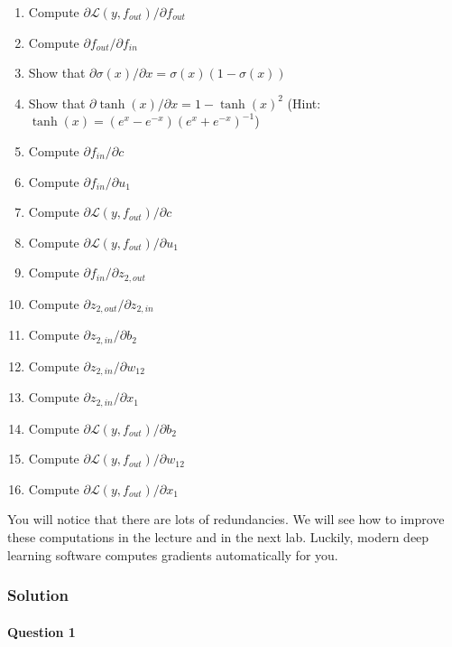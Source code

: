 \documentclass[
  a4paper,
]{article}
\providecommand{\tightlist}{%
  \setlength{\itemsep}{0pt}\setlength{\parskip}{0pt}}
\begin{document}
\begin{enumerate}
\def\labelenumi{\arabic{enumi}.}
\tightlist
\item
  Compute \(\partial\mathcal{L}(y, f_{out})/\partial f_{out}\)
\item
  Compute \(\partial f_{out}/\partial f_{in}\)
\item
  Show that \(\partial\sigma(x)/\partial x=\sigma(x)(1-\sigma(x))\)
\item
  Show that \(\partial\tanh(x)/\partial x=1-\tanh(x)^2\) (Hint:
  \(\tanh(x)=(e^x-e^{-x})(e^x+e^{-x})^{-1}\))
\item
  Compute \(\partial f_{in}/\partial c\)
\item
  Compute \(\partial f_{in}/\partial u_1\)
\item
  Compute \(\partial\mathcal{L}(y, f_{out})/\partial c\)
\item
  Compute \(\partial\mathcal{L}(y, f_{out})/\partial u_1\)
\item
  Compute \(\partial f_{in}/\partial z_{2,out}\)
\item
  Compute \(\partial z_{2,out}/\partial z_{2,in}\)
\item
  Compute \(\partial z_{2,in}/\partial b_2\)
\item
  Compute \(\partial z_{2,in}/\partial w_{12}\)
\item
  Compute \(\partial z_{2,in}/\partial x_1\)
\item
  Compute \(\partial\mathcal{L}(y, f_{out})/\partial b_2\)
\item
  Compute \(\partial\mathcal{L}(y, f_{out})/\partial w_{12}\)
\item
  Compute \(\partial\mathcal{L}(y, f_{out})/\partial x_1\)
\end{enumerate}

You will notice that there are lots of redundancies. We will see how to
improve these computations in the lecture and in the next lab. Luckily,
modern deep learning software computes gradients automatically for you.

\hypertarget{solution-1}{%
\subsubsection{Solution}\label{solution-1}}

\hypertarget{question-1}{%
\paragraph{Question 1}\label{question-1}}
\end{document}
